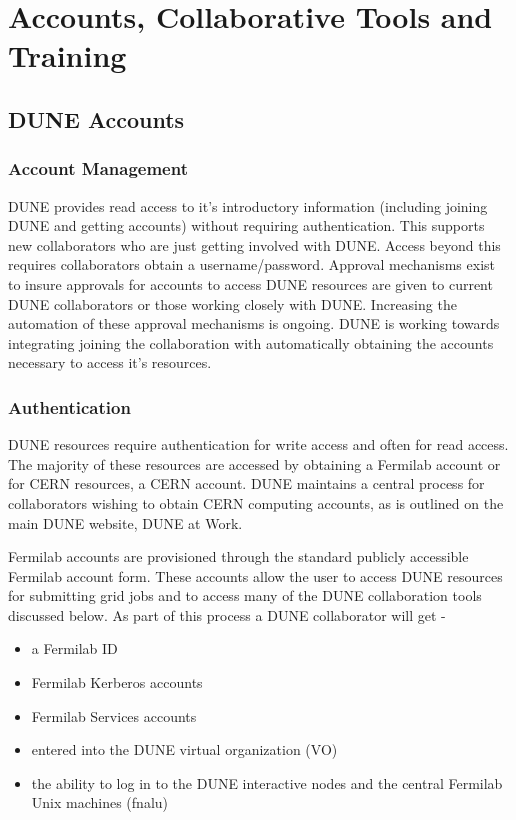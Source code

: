 \chapter{Accounts, Collaborative Tools and Training} %
\section{DUNE Accounts}

\subsection{Account Management}
DUNE provides read access to it's introductory information (including joining DUNE and getting accounts) without requiring authentication.  This supports new collaborators who are just getting involved with DUNE.  Access beyond this requires collaborators obtain a username/password. Approval mechanisms exist to insure approvals for accounts to access DUNE resources are given to current DUNE collaborators or those working closely with DUNE. Increasing the automation of these approval mechanisms is ongoing. DUNE is working towards integrating joining the collaboration with automatically obtaining the accounts necessary to access it's resources.

\subsection{Authentication}
DUNE resources require authentication for write access and often for read access. The majority of these resources are accessed by obtaining a Fermilab account or for CERN resources, a CERN account.  DUNE maintains a central process for collaborators wishing to obtain CERN computing accounts, as is outlined on the main DUNE website, DUNE at Work. 

Fermilab accounts are provisioned through the standard publicly accessible Fermilab account form.  These accounts allow the user to access DUNE resources for submitting grid jobs and to access many of the DUNE collaboration tools discussed below. As part of this process a DUNE collaborator will get -
\begin{itemize}
\item a Fermilab ID
\item Fermilab Kerberos accounts
\item Fermilab Services accounts
\item entered into the DUNE virtual organization (VO)
\item the ability to log in to the DUNE interactive nodes and the central Fermilab Unix machines (fnalu)
\end{itemize}

